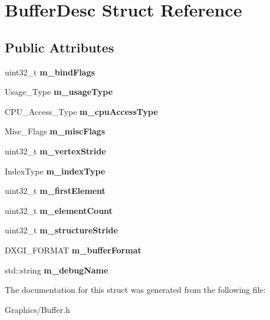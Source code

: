 \hypertarget{structBufferDesc}{}\section{Buffer\+Desc Struct Reference}
\label{structBufferDesc}
\subsection*{Public Attributes}
\begin{DoxyCompactItemize}
\item 
\mbox{\label{structBufferDesc_aec5b4aa274b3e1c8e1ca407cf1cbc0af}} 
uint32\+\_\+t {\bfseries m\+\_\+bind\+Flags}
\item 
\mbox{\label{structBufferDesc_a608b3397ef0ac6c5172189cc42fc676b}} 
Usage\+\_\+\+Type {\bfseries m\+\_\+usage\+Type}
\item 
\mbox{\label{structBufferDesc_a6ee4fbb68f0351850bd71c8185c000f9}} 
C\+P\+U\+\_\+\+Access\+\_\+\+Type {\bfseries m\+\_\+cpu\+Access\+Type}
\item 
\mbox{\label{structBufferDesc_af60d327f66eb6cd4e56255823cf58e6d}} 
Misc\+\_\+\+Flags {\bfseries m\+\_\+misc\+Flags}
\item 
\mbox{\label{structBufferDesc_af5381dcb6c0c6b6b0f1bcaeb1ae18642}} 
uint32\+\_\+t {\bfseries m\+\_\+vertex\+Stride}
\item 
\mbox{\label{structBufferDesc_a76eb0fc282e0aff2eee731ea7ce2e461}} 
Index\+Type {\bfseries m\+\_\+index\+Type}
\item 
\mbox{\label{structBufferDesc_acab9cd5599ccaec586415deb8353f62f}} 
uint32\+\_\+t {\bfseries m\+\_\+first\+Element}
\item 
\mbox{\label{structBufferDesc_a3868b7e07063db3050199780fadf4e03}} 
uint32\+\_\+t {\bfseries m\+\_\+element\+Count}
\item 
\mbox{\label{structBufferDesc_aeb86e6e1e64c56ade38ec6cd1887b057}} 
uint32\+\_\+t {\bfseries m\+\_\+structure\+Stride}
\item 
\mbox{\label{structBufferDesc_af82649bab7d3e365f68bd95bc02a4f28}} 
D\+X\+G\+I\+\_\+\+F\+O\+R\+M\+AT {\bfseries m\+\_\+buffer\+Format}
\item 
\mbox{\label{structBufferDesc_a19a8209c8dfe49f609d1b515d477ec34}} 
std\+::string {\bfseries m\+\_\+debug\+Name}
\end{DoxyCompactItemize}


The documentation for this struct was generated from the following file\+:\begin{DoxyCompactItemize}
\item 
Graphics/Buffer.\+h\end{DoxyCompactItemize}

